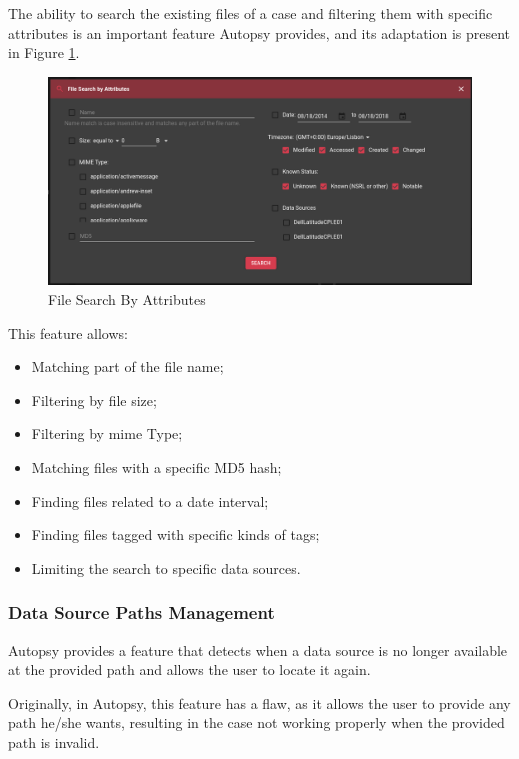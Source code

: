 The ability to search the existing files of a case and filtering them with specific attributes is an important feature Autopsy provides, and its adaptation is present in Figure \ref{fig:search}.

\begin{figure}[ht]
 \centering
 \includegraphics[width=\linewidth]{imgs/search.png}
 \caption{File Search By Attributes}
 \label{fig:search}
\end{figure}

This feature allows:

\begin{itemize}
 \item Matching part of the file name;
 \item Filtering by file size;
 \item Filtering by \acrshort{mime} Type;
 \item Matching files with a specific MD5 hash;
 \item Finding files related to a date interval;
 \item Finding files tagged with specific kinds of tags;
 \item Limiting the search to specific data sources.
\end{itemize}

\subsubsection*{Data Source Paths Management}

Autopsy provides a feature that detects when a data source is no longer available at the provided path and allows the user to locate it again.

Originally, in Autopsy, this feature has a flaw, as it allows the user to provide any path he/she wants, resulting in the case not working properly when the provided path is invalid.

